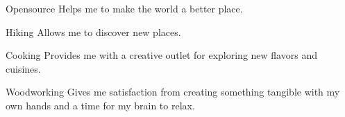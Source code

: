 
\begin{cvskills}

  \cvskill
    {Opensource} %
    {Helps me to make the world a better place.} %

  \cvskill
    {Hiking} %
    {Allows me to discover new places.} %

  \cvskill
    {Cooking} %
    {Provides me with a creative outlet for exploring new flavors and cuisines.} %

  \cvskill
    {Woodworking} %
    {Gives me satisfaction from creating something tangible with my own hands and a time for my brain to relax.} %

\end{cvskills}

